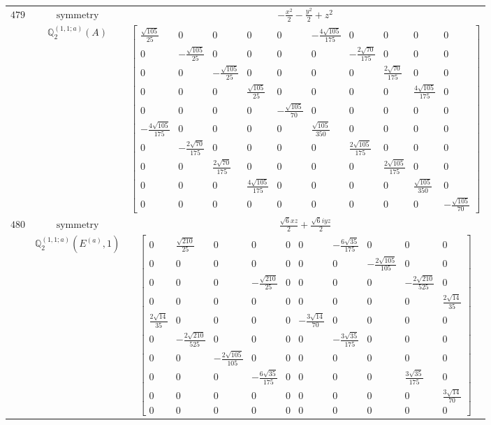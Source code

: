 \documentclass[fleqn,8pt,landscape]{jsarticle}
\begin{document}
\begin{longtable}{ccc}
$ 479 $ & $ \text{symmetry} $ & $ - \frac{x^{2}}{2} - \frac{y^{2}}{2} + z^{2} $ \\
$  $ & $ \mathbb{Q}_{2}^{(1,1;a)}(A) $ & $ \begin{bmatrix} \frac{\sqrt{105}}{25} & 0 & 0 & 0 & 0 & - \frac{4 \sqrt{105}}{175} & 0 & 0 & 0 & 0 \\ 0 & - \frac{\sqrt{105}}{25} & 0 & 0 & 0 & 0 & - \frac{2 \sqrt{70}}{175} & 0 & 0 & 0 \\ 0 & 0 & - \frac{\sqrt{105}}{25} & 0 & 0 & 0 & 0 & \frac{2 \sqrt{70}}{175} & 0 & 0 \\ 0 & 0 & 0 & \frac{\sqrt{105}}{25} & 0 & 0 & 0 & 0 & \frac{4 \sqrt{105}}{175} & 0 \\ 0 & 0 & 0 & 0 & - \frac{\sqrt{105}}{70} & 0 & 0 & 0 & 0 & 0 \\ - \frac{4 \sqrt{105}}{175} & 0 & 0 & 0 & 0 & \frac{\sqrt{105}}{350} & 0 & 0 & 0 & 0 \\ 0 & - \frac{2 \sqrt{70}}{175} & 0 & 0 & 0 & 0 & \frac{2 \sqrt{105}}{175} & 0 & 0 & 0 \\ 0 & 0 & \frac{2 \sqrt{70}}{175} & 0 & 0 & 0 & 0 & \frac{2 \sqrt{105}}{175} & 0 & 0 \\ 0 & 0 & 0 & \frac{4 \sqrt{105}}{175} & 0 & 0 & 0 & 0 & \frac{\sqrt{105}}{350} & 0 \\ 0 & 0 & 0 & 0 & 0 & 0 & 0 & 0 & 0 & - \frac{\sqrt{105}}{70} \end{bmatrix} $ \\ \hline
$ 480 $ & $ \text{symmetry} $ & $ \frac{\sqrt{6} x z}{2} + \frac{\sqrt{6} i y z}{2} $ \\
$  $ & $ \mathbb{Q}_{2}^{(1,1;a)}(E^{(a)},1) $ & $ \begin{bmatrix} 0 & \frac{\sqrt{210}}{25} & 0 & 0 & 0 & 0 & - \frac{6 \sqrt{35}}{175} & 0 & 0 & 0 \\ 0 & 0 & 0 & 0 & 0 & 0 & 0 & - \frac{2 \sqrt{105}}{105} & 0 & 0 \\ 0 & 0 & 0 & - \frac{\sqrt{210}}{25} & 0 & 0 & 0 & 0 & - \frac{2 \sqrt{210}}{525} & 0 \\ 0 & 0 & 0 & 0 & 0 & 0 & 0 & 0 & 0 & \frac{2 \sqrt{14}}{35} \\ \frac{2 \sqrt{14}}{35} & 0 & 0 & 0 & 0 & - \frac{3 \sqrt{14}}{70} & 0 & 0 & 0 & 0 \\ 0 & - \frac{2 \sqrt{210}}{525} & 0 & 0 & 0 & 0 & - \frac{3 \sqrt{35}}{175} & 0 & 0 & 0 \\ 0 & 0 & - \frac{2 \sqrt{105}}{105} & 0 & 0 & 0 & 0 & 0 & 0 & 0 \\ 0 & 0 & 0 & - \frac{6 \sqrt{35}}{175} & 0 & 0 & 0 & 0 & \frac{3 \sqrt{35}}{175} & 0 \\ 0 & 0 & 0 & 0 & 0 & 0 & 0 & 0 & 0 & \frac{3 \sqrt{14}}{70} \\ 0 & 0 & 0 & 0 & 0 & 0 & 0 & 0 & 0 & 0 \end{bmatrix} $ \\ \hline

\end{longtable}
\end{document}
